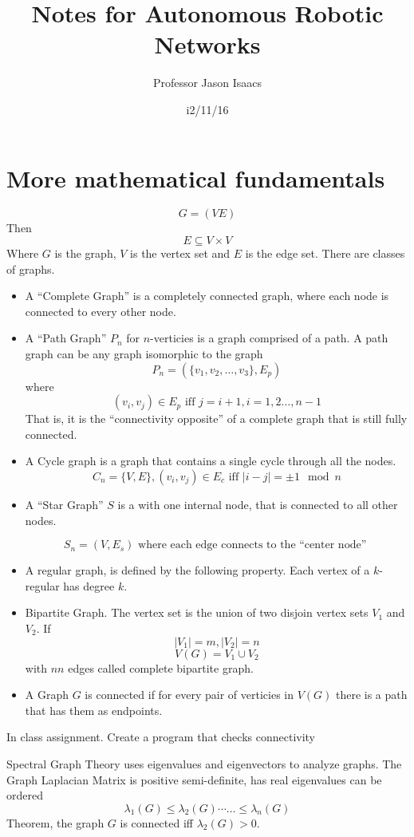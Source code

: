\documentclass{article}
\title{Notes for Autonomous Robotic Networks}
\author{Professor Jason Isaacs}
\date{i2/11/16}
\begin{document}
\maketitle
\section{More mathematical fundamentals}
\[ G=(VE) \]
Then 
\[ E \subseteq V \times V \]
Where $G$ is the graph, $V$ is the vertex set and $E$ is the edge set. 
There are classes of graphs. 
\begin{itemize}
\item A ``Complete Graph'' is a completely connected graph, where each node is
connected to every other node. 
\item A ``Path Graph'' $P_n$ for $n$-verticies is a graph comprised of a path. A
path graph can be any graph isomorphic to the graph
\[ P_n = (\{v_1, v_2,\ldots,v_3\},E_p) \]
where 
\[ (v_i, v_j) \in E_p \text{ iff } j = i+1, i = 1,2\ldots, n-1 \]
That is, it is the ``connectivity opposite'' of a complete graph that is still
fully connected.

\item A Cycle graph is a graph that contains a single cycle through all the
nodes. 
\[ C_n = \{V, E \}, (v_i,v_j)\in E_c \text{ iff } |i-j| = \pm 1 \mod n \]

\item A ``Star Graph'' $S$ is a with one internal node, that is connected to all
other nodes. 

\[ S_n = (V,E_s) \text{ where each edge connects to the ``center node'' } \]

\item A regular graph, is defined by the following property. Each vertex of a $k$-regular has degree $k$. 

\item Bipartite Graph. The vertex set is the union of two disjoin vertex sets
$V_1$ and $V_2$. 
If 
\[ |V_1| = m, |V_2| = n \]
\[ V(G) = V_1 \cup V_2 \]
with $nn$ edges called complete bipartite graph. 

\item A Graph $G$ is connected if for every pair of verticies in $V(G)$ there is
a path that has them as endpoints. 

\end{itemize}

In class assignment. Create a program that checks connectivity

Spectral Graph Theory uses eigenvalues and eigenvectors to analyze graphs. The
Graph Laplacian Matrix is positive semi-definite, has real eigenvalues can be
ordered
\[ \lambda_1(G) \leq \lambda_2(G) \cdots \ldots \leq \lambda_n(G) \]
Theorem, the graph $G$ is connected iff $\lambda_2(G) > 0$. 
\end{document}
